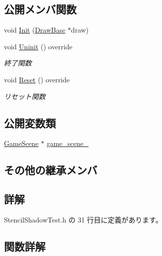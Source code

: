 \subsection*{公開メンバ関数}
\begin{DoxyCompactItemize}
\item 
void \mbox{\hyperlink{class_stencil_shadow_test_a4a58695fafd134d750eb23ee5ec2bdb6}{Init}} (\mbox{\hyperlink{class_draw_base}{Draw\+Base}} $\ast$draw)
\item 
void \mbox{\hyperlink{class_stencil_shadow_test_a51b5d75aaba5673a13f950bd6b742720}{Uninit}} () override
\begin{DoxyCompactList}\small\item\em 終了関数 \end{DoxyCompactList}\item 
void \mbox{\hyperlink{class_stencil_shadow_test_a7691120143c64b99d6c8f5391be56e83}{Reset}} () override
\begin{DoxyCompactList}\small\item\em リセット関数 \end{DoxyCompactList}\end{DoxyCompactItemize}
\subsection*{公開変数類}
\begin{DoxyCompactItemize}
\item 
\mbox{\hyperlink{class_game_scene}{Game\+Scene}} $\ast$ \mbox{\hyperlink{class_stencil_shadow_test_ac108faf317516a8335f73ca8005fbb20}{game\+\_\+scene\+\_\+}}
\end{DoxyCompactItemize}
\subsection*{その他の継承メンバ}


\subsection{詳解}


 Stencil\+Shadow\+Test.\+h の 31 行目に定義があります。



\subsection{関数詳解}
\mbox{\label{class_stencil_shadow_test_a4a58695fafd134d750eb23ee5ec2bdb6}} 

